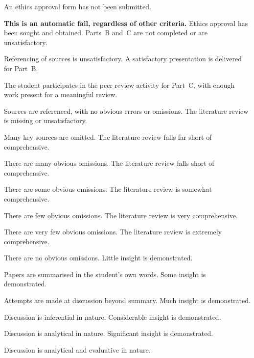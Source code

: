 \begin{markingrubric}
		\grade\fail An ethics approval form has not been submitted.
			\par \textbf{This is an automatic fail, regardless of other criteria.}
		\grade Ethics approval has been sought and obtained.
		\grade\fail Parts~B and~C are not completed or are unsatisfactory.
			\par Referencing of sources is unsatisfactory.
		\grade A satisfactory presentation is delivered for Part~B.
			\par The student participates in the peer review activity for Part~C, with enough work present for a meaningful review.
			\par Sources are referenced, with no obvious errors or omissions.
        \grade \fail 	The literature review is missing or unsatisfactory.
        	\par 		Many key sources are omitted.
        \grade 		The literature review falls far short of comprehensive.
        	\par 		There are many obvious omissions.
        \grade		The literature review falls short of comprehensive.
        	\par 		There are some obvious omissions.
        \grade 		The literature review is somewhat comprehensive.
        	\par 		There are few obvious omissions.
        \grade		The literature review is very comprehensive.
        	\par 		There are very few obvious omissions.
        \grade		The literature review is extremely comprehensive.
        	\par 		There are no obvious omissions.
        \grade\fail 	Little insight is demonstrated.
        \par		Papers are summarised in the student's own words.
        \grade		Some insight is demonstrated.
        \par		Attempts are made at discussion beyond summary.
        \grade		Much insight is demonstrated.
        \par		Discussion is inferential in nature.
        \grade		Considerable insight is demonstrated.
        \par		Discussion is analytical in nature.
        \grade		Significant insight is demonstrated.
        \par		Discussion is analytical and evaluative in nature.

\end{markingrubric}
